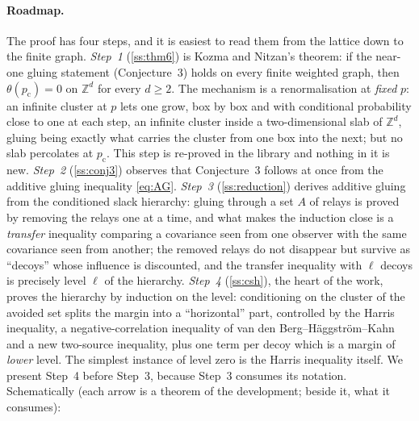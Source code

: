 \documentclass[11pt]{article}
\theoremstyle{definition}
\theoremstyle{remark}
\newcommand{\Zd}{\mathbb{Z}^d}
\newcommand{\pc}{p_{\mathrm c}}
\begin{document}
\paragraph{Roadmap.}
The proof has four steps, and it is easiest to read them from the lattice down to the finite graph.
\emph{Step~1} (\cref{ss:thm6}) is Kozma and Nitzan's theorem: if the near-one gluing statement (Conjecture~3) holds on every finite weighted
graph, then $\theta(\pc)=0$ on $\Zd$ for every $d\ge2$.  The mechanism is a renormalisation at \emph{fixed} $p$: an infinite cluster at $p$
lets one grow, box by box and with conditional probability close to one at each step, an infinite cluster inside a two-dimensional slab of
$\Zd$, gluing being exactly what carries the cluster from one box into the next; but no slab percolates at $\pc$.  This step is re-proved in
the library and nothing in it is new.  \emph{Step~2} (\cref{ss:conj3}) observes that Conjecture~3 follows at once from the additive gluing
inequality \eqref{eq:AG}.  \emph{Step~3} (\cref{ss:reduction}) derives additive gluing from the conditioned slack hierarchy: gluing through
a set $A$ of relays is proved by removing the relays one at a time, and what makes the induction close is a \emph{transfer} inequality
comparing a covariance seen from one observer with the same covariance seen from another; the removed relays do not disappear but survive as
``decoys'' whose influence is discounted, and the transfer inequality with $\ell$ decoys is precisely level $\ell$ of the hierarchy.
\emph{Step~4} (\cref{ss:csh}), the heart of the work, proves the hierarchy by induction on the level: conditioning on the cluster of the
avoided set splits the margin into a ``horizontal'' part, controlled by the Harris inequality, a negative-correlation inequality of
van den Berg--H\"aggstr\"om--Kahn and a new two-source inequality, plus one term per decoy which is a margin of \emph{lower} level.  The
simplest instance of level zero is the Harris inequality itself.  We present Step~4 before Step~3, because Step~3 consumes its notation.
Schematically (each arrow is a theorem of the development; beside it, what it consumes):
\end{document}
